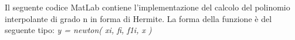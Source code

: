 Il seguente codice MatLab contiene l'implementazione del calcolo del polinomio interpolante di grado n in forma di Hermite. La forma della funzione è del seguente tipo: \textit{y = newton( xi, fi, f1i, x )}\\\
